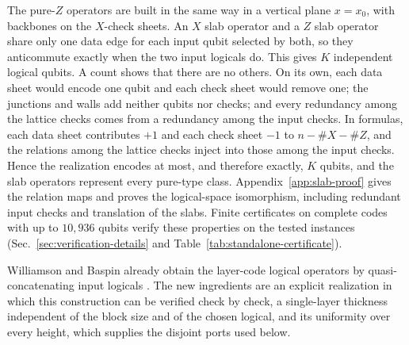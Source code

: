 The pure-$Z$ operators are built in the same way in a vertical plane
$x=x_0$, with backbones on the $X$-check sheets.  An $X$ slab operator and a
$Z$ slab operator share only one data edge for each input qubit selected by
both, so they anticommute exactly when the two input logicals do.  This gives
$K$ independent logical qubits.  A count shows that there are no others.  On
its own, each data sheet would encode one qubit and each check sheet would
remove one; the junctions and walls add neither qubits nor checks; and every
redundancy among the lattice checks comes from a redundancy among the input
checks.  In formulas, each data sheet contributes $+1$ and each check sheet
$-1$ to $n-\#X-\#Z$, and the relations among the lattice checks inject into
those among the input checks.  Hence the realization encodes at most, and
therefore exactly, $K$ qubits, and the slab operators represent every
pure-type class.  Appendix~\ref{app:slab-proof} gives the relation maps and proves the
logical-space isomorphism, including redundant input checks and translation
of the slabs. Finite certificates on complete codes with up to $10{,}936$
qubits verify these properties on the tested instances
(Sec.~\ref{sec:verification-details} and Table~\ref{tab:standalone-certificate}).

Williamson and Baspin already obtain the layer-code logical operators by
quasi-concatenating input logicals \cite{WilliamsonBaspinLayerCodes}.  The
new ingredients are an explicit realization in which this construction can
be verified check by check, a single-layer thickness independent of the block
size and of the chosen logical, and its uniformity over every height, which
supplies the disjoint ports used below.

